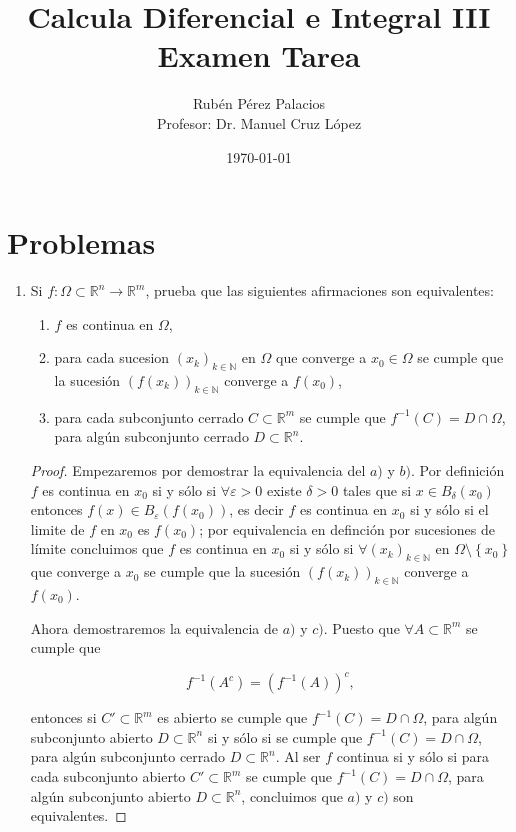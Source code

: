 \documentclass[letterpaper]{article}
\title{Calcula Diferencial e Integral III\\Examen Tarea}
\author{Rubén Pérez Palacios\\Profesor: Dr. Manuel Cruz López}
\date{\today}
\theoremstyle{definition}
\theoremstyle{lemathm}
\theoremstyle{lemathm}
\theoremstyle{lemademthm}
\newcommand{\pars}[1]{\left( #1 \right) }
\newcommand{\set}[1]{\left \{ #1 \right\} }
\newcommand{\N}{\mathbb{N}}
\newcommand{\R}{\mathbb{R}}
\newcommand{\1}{\mathbbm{1}}
\newcommand{\To}{\longrightarrow}
\begin{document}
	\maketitle
    
    \section*{Problemas}

	\begin{enumerate}
		
		\item Si $f:\Omega\subset \R^n\To \R^m$, prueba que las siguientes afirmaciones son equivalentes:
		\begin{enumerate}
			\item $f$ es continua en $\Omega$,
			\item para cada sucesion $\pars{x_k}_{k\in\N}$ en $\Omega$ que converge a $x_0\in \Omega$ se cumple que la sucesi\'on $(f(x_k))_{k\in \N}$ converge a $f(x_0)$,
			\item para cada subconjunto cerrado $C\subset \R^m$ se cumple que $f^{-1}(C)=D\cap \Omega$, para alg\'un subconjunto cerrado $D\subset \R^n$.
		\end{enumerate} 

		\begin{proof}

			Empezaremos por demostrar la equivalencia del $a)$ y $b)$. Por definición $f$ es continua en $x_0$ si y sólo si $\forall \varepsilon > 0$ existe $\delta > 0$ tales que si $x\in B_\delta(x_0)$ entonces $f(x)\in B_\varepsilon(f(x_0))$, es decir $f$ es continua en $x_0$ si y sólo si el limite de $f$ en $x_0$ es $f(x_0)$; por equivalencia en definción por sucesiones de límite concluimos que $f$ es continua en $x_0$ si y sólo si $\forall \pars{x_k}_{k\in\N}$ en $\Omega\setminus\set{x_0}$ que converge a $x_0$ se cumple que la sucesión $(f(x_k))_{k\in \N}$ converge a $f(x_0)$.
	
			Ahora demostraremos la equivalencia de $a)$ y $c)$. Puesto que $\forall A\subset \R^m$ se cumple que
			
			\[f^{-1}\pars{A^c} = \pars{f^{-1}\pars{A}}^c,\]
			
			entonces si $C' \subset \R^m$ es abierto se cumple que $f^{-1}(C)=D\cap \Omega$, para algún subconjunto abierto $D\subset \R^n$ si y sólo si se cumple que $f^{-1}(C)=D\cap \Omega$, para alg\'un subconjunto cerrado $D\subset \R^n$. Al ser $f$ continua si y sólo si para cada subconjunto abierto $C'\subset \R^m$ se cumple que $f^{-1}(C)=D\cap \Omega$, para algún subconjunto abierto $D\subset \R^n$, concluimos que $a)$ y $c)$ son equivalentes.
			

\end{proof}
\end{enumerate}
\end{document}
